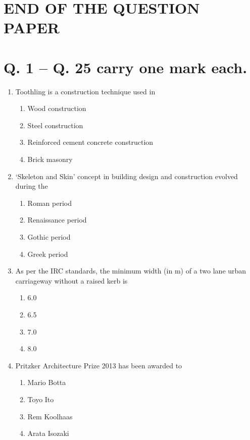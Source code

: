\documentclass[journal,12pt,onecolumn]{IEEEtran}
\theoremstyle{remark}
\begin{document}
\section*{END OF THE QUESTION PAPER}

\section*{Q. 1 – Q. 25 carry one mark each.}

\begin{enumerate}

\item Toothling is a construction technique used in

\hfill{}
\begin{enumerate}
\item Wood construction
\item Steel construction
\item Reinforced cement concrete construction
\item Brick masonry
\end{enumerate}

\item ‘Skeleton and Skin’ concept in building design and construction evolved during the

\hfill{}
\begin{enumerate}
\item Roman period
\item Renaissance period
\item Gothic period
\item Greek period
\end{enumerate}

\item As per the IRC standards, the minimum width (in m) of a two lane urban carriageway without a raised kerb is

\hfill{}
\begin{enumerate}
\item 6.0
\item 6.5
\item 7.0
\item 8.0
\end{enumerate}

\item Pritzker Architecture Prize 2013 has been awarded to
\begin{enumerate}
\item Mario Botta
\item Toyo Ito
\item Rem Koolhaas
\item Arata Isozaki
\end{enumerate}


\end{enumerate}
\end{document}
